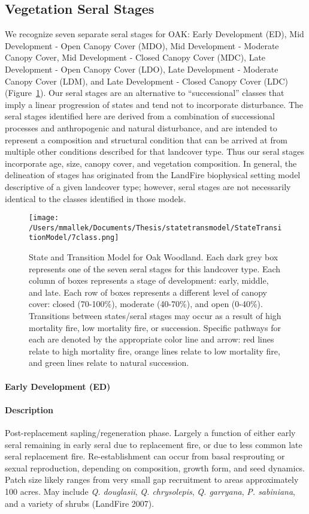 \subsection*{Vegetation Seral Stages}
We recognize seven separate seral stages for OAK: Early Development (ED), Mid Development - Open Canopy Cover (MDO), Mid Development - Moderate Canopy Cover, Mid Development - Closed Canopy Cover (MDC), Late Development - Open Canopy Cover (LDO), Late Development - Moderate Canopy Cover (LDM), and Late Development - Closed Canopy Cover (LDC) (Figure~\ref{oak_transmodel}). Our seral stages are an alternative to ``successional'' classes that imply a linear progression of states and tend not to incorporate disturbance. The seral stages identified here are derived from a combination of successional processes and anthropogenic and natural disturbance, and are intended to represent a composition and structural condition that can be arrived at from multiple other conditions described for that landcover type. Thus our seral stages incorporate age, size, canopy cover, and vegetation composition. In general, the delineation of stages has originated from the LandFire biophysical setting model descriptive of a given landcover type; however, seral stages are not necessarily identical to the classes identified in those models.


\begin{figure}[htbp]
\centering
\texttt{[image: /Users/mmallek/Documents/Thesis/statetransmodel/StateTransitionModel/7class.png]}
\caption{State and Transition Model for Oak Woodland. Each dark grey box represents one of the seven seral stages for this landcover type. Each column of boxes represents a stage of development: early, middle, and late. Each row of boxes represents a different level of canopy cover: closed (70-100\%), moderate (40-70\%), and open (0-40\%). Transitions between states/seral stages may occur as a result of high mortality fire, low mortality fire, or succession. Specific pathways for each are denoted by the appropriate color line and arrow: red lines relate to high mortality fire, orange lines relate to low mortality fire, and green lines relate to natural succession.} 
\label{oak_transmodel}
\end{figure}

\paragraph{Early Development (ED)}

\paragraph{Description} Post-replacement sapling/regeneration phase. Largely a function of either early seral remaining in early seral due to replacement fire, or due to less common late seral replacement fire. Re-establishment can occur from basal resprouting or sexual reproduction, depending on composition, growth form, and seed dynamics. Patch size likely ranges from very small gap recruitment to areas approximately 100 acres. May include \emph{Q. douglasii}, \emph{Q. chrysolepis}, \emph{Q. garryana}, \emph{P. sabiniana}, and a variety of shrubs (LandFire 2007).



